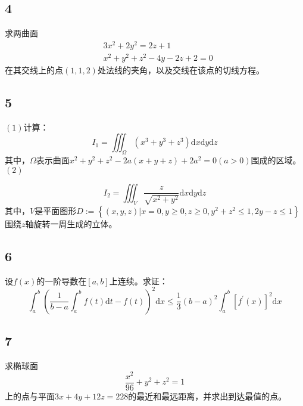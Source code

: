 \documentclass[a4paper,12pt]{article}
\begin{document}
\subsection*{4}\noindent 求两曲面
\begin{equation*}
	\begin{aligned}
		&3x^2+2y^2=2z+1\\&x^2+y^2+z^2-4y-2z+2=0
	\end{aligned}
\end{equation*}
在其交线上的点$\left(1,1,2\right)$处法线的夹角，以及交线在该点的切线方程。
\subsection*{5}\noindent$\left(1\right)$计算：
\begin{equation*}
	I_{1}=\iiint_{\Omega}\left(x^3+y^3+z^3\right)\mathrm{d}x\mathrm{d}y\mathrm{d}z
\end{equation*}
其中，$\Omega$表示曲面$x^2+y^2+z^2-2a\left(x+y+z\right)+2a^2=0\left(a>0\right)$围成的区域。\\
\noindent$\left(2\right)$

\begin{equation*}
	I_{2}=\iiint_{V}\frac{z}{\sqrt{x^2+y^2}}\mathrm{d}x\mathrm{d}y\mathrm{d}z
\end{equation*}
其中，$V$是平面图形$D:=\left\{\left(x,y,z\right)|x=0,y\geq0,z\geq0,y^2+z^2\leq1,2y-z\leq1\right\}$围绕$z$轴旋转一周生成的立体。

\subsection*{6}设$f\left(x\right)$的一阶导数在$\left[a,b\right]$上连续。求证：
\begin{equation*}
	\int_{a}^{b}\left(\frac{1}{b-a}\int_{a}^{b}f\left(t\right)\mathrm{d}t-f\left(t\right)\right)^2\mathrm{d}x\leq\frac{1}{3}\left(b-a\right)^2\int_{a}^{b}\left[f^{\prime}\left(x\right)\right]^2\mathrm{d}x
\end{equation*}
\subsection*{7}\noindent 求椭球面\begin{equation*}
	\frac{x^2}{96}+y^2+z^2=1
\end{equation*}
上的点与平面$3x+4y+12z=228$的最近和最远距离，并求出到达最值的点。
\end{document}
